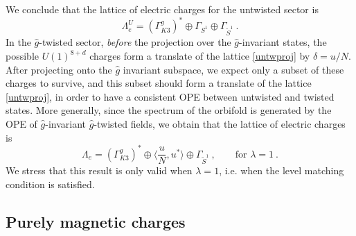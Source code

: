 \documentclass[a4paper,11pt]{article}
\newcommand{\ZZ}{\mathbb{Z}}
\newcommand{\E}{\mathcal{E}}
\numberwithin{equation}{section}
\def\be{\begin{equation}}
\def\ee{\end{equation}}
\begin{document}
We conclude that the lattice of electric charges for the untwisted sector is
\be\label{untwproj} \Lambda_e^{U}=(\Gamma_{K3}^g)^*\oplus \Gamma_{S^1} \oplus \Gamma_{\tilde S^1}\ .
\ee In the $\hat g$-twisted sector, \emph{before} the projection over the $\hat g$-invariant states, the possible $U(1)^{8+d}$ charges form a translate of the lattice \eqref{untwproj} by $\delta=u/ N$. After projecting onto the $\hat g$ invariant subspace, we expect only a subset of these charges to survive, and this subset should form a translate of the lattice \eqref{untwproj}, in order to have a consistent OPE between untwisted and twisted states.
More generally, since the spectrum of the orbifold is generated by the OPE of $\hat g$-invariant $\hat g$-twisted fields, we obtain that the lattice of electric charges is
\be\label{electLattsimpl} \Lambda_e=(\Gamma_{K3}^g)^*\oplus \langle \frac{u}{N}, u^*\rangle \oplus \Gamma_{\tilde S^1}\ ,\qquad \text{for }\lambda=1\ .
\ee  
We stress that this result is only valid when $\lambda=1$, i.e. when the level matching condition is satisfied. 

\subsection{Purely magnetic charges}
\end{document}
